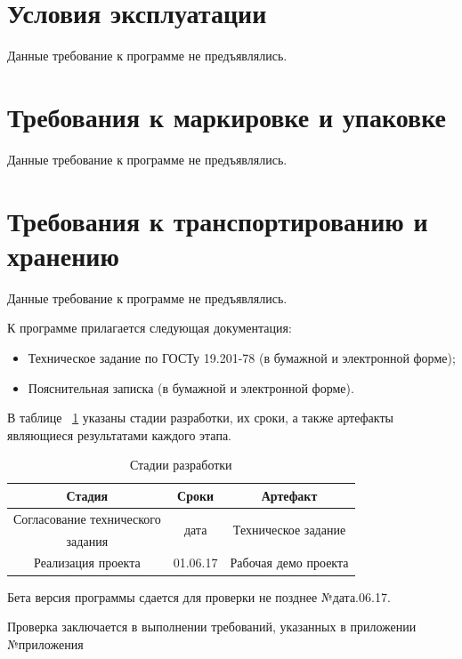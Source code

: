 \documentclass[a4paper,english]{G2-105}
\begin{document}
	\section{Условия эксплуатации}
		\par Данные требование к программе не предъявлялись.
	\section{Требования к маркировке и упаковке}
		\par Данные требование к программе не предъявлялись.
	\section{Требования к транспортированию и хранению}
		\par Данные требование к программе не предъявлялись.
		
	К программе прилагается следующая документация:
	\begin{itemize}
		\item Техническое задание по ГОСТу 19.201-78 (в бумажной и электронной форме);
		\item Пояснительная записка (в бумажной и электронной форме).
	\end{itemize}
	
	\par В таблице ~\ref{stages} указаны стадии разработки, их сроки, а также артефакты являющиеся результатами каждого этапа.
	\begin{longtable}{|c|c|c|}
		\caption {Стадии разработки} \label{stages} \\ \hline
		    Стадия 				& Сроки 		         &         Артефакт \\ \hline \endhead
		    Согласование технического &\multirow{2}{*}{ дата} & \multirow{2}{*}{Техническое задание} \\ 
		    задания				&			         &		\\ \hline
		    Реализация проекта		&01.06.17		         & Рабочая демо проекта \\ \hline
	\end{longtable}
	
	\par Бета версия программы сдается для проверки не позднее №дата.06.17.
	\par Проверка заключается в выполнении требований, указанных в приложении №приложения
\end{document}
